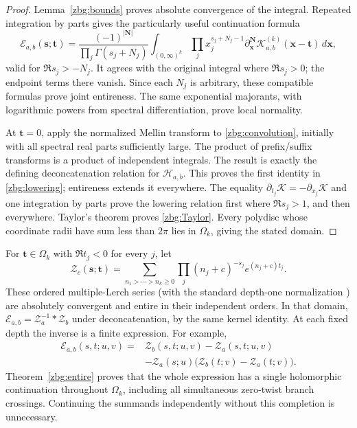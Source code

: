 \documentclass[11pt,letterpaper]{article}
\numberwithin{equation}{section}
\theoremstyle{plain}
\theoremstyle{definition}
\theoremstyle{remark}
\begin{document}
\begin{proof}
Lemma~\ref{zbg:bounds} proves absolute convergence of the integral.
Repeated integration by parts gives the particularly useful continuation
formula
\begin{equation}\label{zbg:continuation}
 \mathscr E_{a,b}(\boldsymbol s;\boldsymbol t)
 =\frac{(-1)^{|\boldsymbol N|}}
             {\prod_j\Gamma(s_j+N_j)}
    \int_{(0,\infty)^k}\prod_jx_j^{s_j+N_j-1}
      \partial_{\boldsymbol x}^{\boldsymbol N}
          \mathscr K_{a,b}^{(k)}(\boldsymbol x-\boldsymbol t)
                                                    \,d\boldsymbol x,
\end{equation}
valid for $\Re s_j>-N_j$.  It agrees with the original integral
where $\Re s_j>0$; the endpoint terms there vanish.  Since each
$N_j$ is arbitrary, these compatible formulas prove joint entireness.
The same exponential majorants, with logarithmic powers from spectral
differentiation, prove local normality.

At $\boldsymbol t=0$, apply the normalized Mellin transform to
\eqref{zbg:convolution}, initially with all spectral real parts
sufficiently large.  The product of prefix/suffix transforms is a
product of independent integrals.  The result is exactly the defining
deconcatenation relation for $\mathcal H_{a,b}$.  This proves the
first identity in \eqref{zbg:lowering}; entireness extends it everywhere.
The equality $\partial_{t_j}\mathscr K=-\partial_{x_j}\mathscr K$
and one integration by parts prove the lowering relation first where
$\Re s_j>1$, and then everywhere.  Taylor's theorem proves
\eqref{zbg:Taylor}.  Every polydisc whose coordinate radii have sum
less than $2\pi$ lies in $\Omega_k$, giving the stated domain.
\end{proof}

For $\boldsymbol t\in\Omega_k$ with $\Re t_j<0$ for every $j$, let
\[
 \mathscr Z_c(\boldsymbol s;\boldsymbol t)
 =\sum_{n_1>\cdots>n_k\geq0}
       \prod_j(n_j+c)^{-s_j}e^{(n_j+c)t_j}.
\]
These ordered multiple-Lerch series (with the standard depth-one
normalization \cite[\S25.14]{DLMFLerch}) are absolutely convergent and
entire in their independent orders.  In that domain,
$\mathscr E_{a,b}=\mathscr Z_a^{-1}*\mathscr Z_b$ under
deconcatenation, by the same kernel identity.  At each fixed depth the
inverse is a finite expression.  For example,
\begin{align*}
 \mathscr E_{a,b}(s,t;u,v)={}&
  \mathscr Z_b(s,t;u,v)-\mathscr Z_a(s,t;u,v)\\
 &-\mathscr Z_a(s;u)
               \bigl(\mathscr Z_b(t;v)-\mathscr Z_a(t;v)\bigr).
\end{align*}
Theorem~\ref{zbg:entire} proves that the whole expression has a
single holomorphic continuation throughout $\Omega_k$, including all
simultaneous zero-twist branch crossings.  Continuing the summands
independently without this completion is unnecessary.
\end{document}
